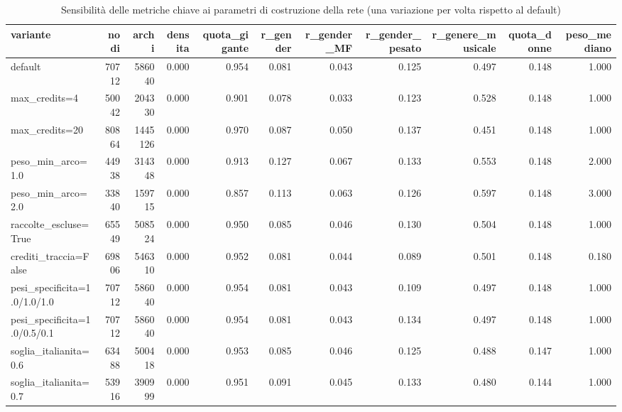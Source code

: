 \begin{table}
\centering
\caption{Sensibilità delle metriche chiave ai parametri di costruzione della rete (una variazione per volta rispetto al default)}
\label{tab:t5_sensibilita}
\begin{tabular}{lrrrrrrrrrr}
\toprule
                    variante &  nodi &   archi &  densita &  quota\_gigante &  r\_gender &  r\_gender\_MF &  r\_gender\_pesato &  r\_genere\_musicale &  quota\_donne &  peso\_mediano \\
\midrule
                     default & 70712 &  586040 &    0.000 &          0.954 &     0.081 &        0.043 &            0.125 &              0.497 &        0.148 &         1.000 \\
               max\_credits=4 & 50042 &  204330 &    0.000 &          0.901 &     0.078 &        0.033 &            0.123 &              0.528 &        0.148 &         1.000 \\
              max\_credits=20 & 80864 & 1445126 &    0.000 &          0.970 &     0.087 &        0.050 &            0.137 &              0.451 &        0.148 &         1.000 \\
           peso\_min\_arco=1.0 & 44938 &  314348 &    0.000 &          0.913 &     0.127 &        0.067 &            0.133 &              0.553 &        0.148 &         2.000 \\
           peso\_min\_arco=2.0 & 33840 &  159715 &    0.000 &          0.857 &     0.113 &        0.063 &            0.126 &              0.597 &        0.148 &         3.000 \\
       raccolte\_escluse=True & 65549 &  508524 &    0.000 &          0.950 &     0.085 &        0.046 &            0.130 &              0.504 &        0.148 &         1.000 \\
       crediti\_traccia=False & 69806 &  546310 &    0.000 &          0.952 &     0.081 &        0.044 &            0.089 &              0.501 &        0.148 &         0.180 \\
pesi\_specificita=1.0/1.0/1.0 & 70712 &  586040 &    0.000 &          0.954 &     0.081 &        0.043 &            0.109 &              0.497 &        0.148 &         1.000 \\
pesi\_specificita=1.0/0.5/0.1 & 70712 &  586040 &    0.000 &          0.954 &     0.081 &        0.043 &            0.134 &              0.497 &        0.148 &         1.000 \\
       soglia\_italianita=0.6 & 63488 &  500418 &    0.000 &          0.953 &     0.085 &        0.046 &            0.125 &              0.488 &        0.147 &         1.000 \\
       soglia\_italianita=0.7 & 53916 &  390999 &    0.000 &          0.951 &     0.091 &        0.045 &            0.133 &              0.480 &        0.144 &         1.000 \\
\bottomrule
\end{tabular}
\end{table}
